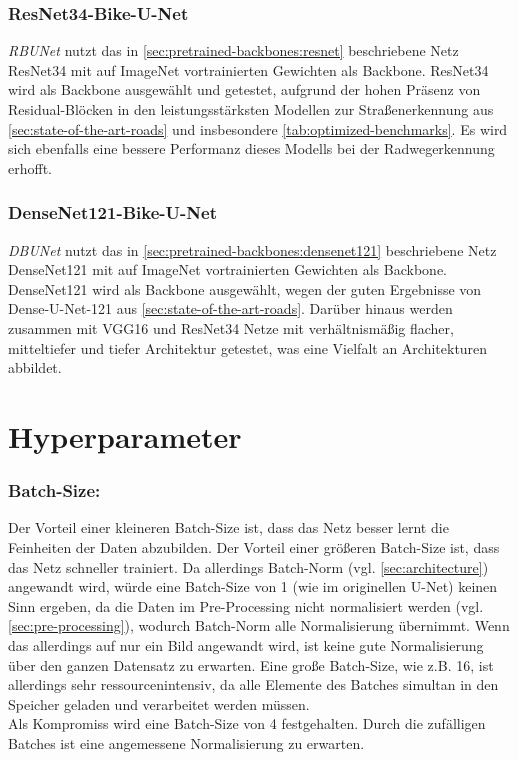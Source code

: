 \subsubsection{ResNet34-Bike-U-Net}

\textit{\ac{RBUNet}} nutzt das in \autoref{sec:pretrained-backbones:resnet} beschriebene Netz ResNet34 
mit auf ImageNet vortrainierten Gewichten als Backbone. 
ResNet34 wird als Backbone ausgewählt und getestet, aufgrund der hohen Präsenz von 
Residual-Blöcken in den leistungsstärksten Modellen 
zur Straßenerkennung aus \autoref{sec:state-of-the-art-roads} und insbesondere \autoref{tab:optimized-benchmarks}.
Es wird sich ebenfalls eine bessere Performanz dieses Modells bei der Radwegerkennung erhofft. 

\subsubsection{DenseNet121-Bike-U-Net}

\textit{\ac{DBUNet}} nutzt das in \autoref{sec:pretrained-backbones:densenet121} beschriebene Netz DenseNet121 
mit auf ImageNet vortrainierten Gewichten als Backbone.
DenseNet121 wird als Backbone ausgewählt, wegen der guten Ergebnisse von Dense-U-Net-121 aus \autoref{sec:state-of-the-art-roads}. 
Darüber hinaus werden zusammen mit VGG16 und ResNet34 Netze mit verhältnismäßig flacher, mitteltiefer und tiefer 
Architektur getestet, was eine Vielfalt an Architekturen abbildet.

\section{Hyperparameter} \label{sec:hyperparameter}

\subsubsection{Batch-Size:}

Der Vorteil einer kleineren Batch-Size ist, dass das Netz besser lernt die Feinheiten der Daten abzubilden. 
Der Vorteil einer größeren Batch-Size ist, dass das Netz schneller trainiert. 
Da allerdings Batch-Norm (vgl. \autoref{sec:architecture}) angewandt wird, würde eine Batch-Size von 1 (wie im originellen U-Net) keinen 
Sinn ergeben, da die Daten im Pre-Processing nicht normalisiert werden (vgl. \autoref{sec:pre-processing}), wodurch Batch-Norm alle 
Normalisierung übernimmt. Wenn das allerdings auf nur ein Bild angewandt wird, ist keine gute Normalisierung über den ganzen Datensatz zu erwarten. 
Eine große Batch-Size, wie z.B. 16, ist allerdings sehr ressourcenintensiv, da alle Elemente des Batches simultan in den Speicher geladen und verarbeitet 
werden müssen. \\
Als Kompromiss wird eine Batch-Size von 4 festgehalten. Durch die zufälligen Batches ist eine angemessene Normalisierung zu erwarten.

